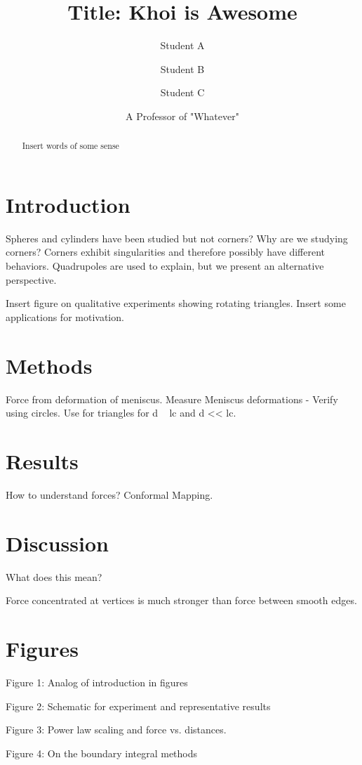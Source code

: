 \documentclass[twocolumn,prl]{revtex4-1}
\begin{document}
\title{Title: Khoi is Awesome}
\author{Student A}
\author{Student B}
\author{Student C}
\author{A Professor of "Whatever"}

\begin{abstract}
Insert words of some sense
\end{abstract}

\maketitle

\section{Introduction}
Spheres and cylinders have been studied but not corners? Why are we studying corners? Corners exhibit singularities and therefore possibly have different behaviors. Quadrupoles are used to explain, but we present an alternative perspective.

Insert figure on qualitative experiments showing rotating triangles.
Insert some applications for motivation.

\section{Methods}
Force from deformation of meniscus. Measure Meniscus deformations - Verify using circles. Use for triangles for d ~ lc and d << lc.

\section{Results}
How to understand forces? Conformal Mapping.

\section{Discussion}
What does this mean?

Force concentrated at vertices is much stronger than force between smooth edges.

\section{Figures}
Figure 1: Analog of introduction in figures

Figure 2: Schematic for experiment and representative results 

Figure 3: Power law scaling and force vs. distances.

Figure 4: On the boundary integral methods
\end{document}
